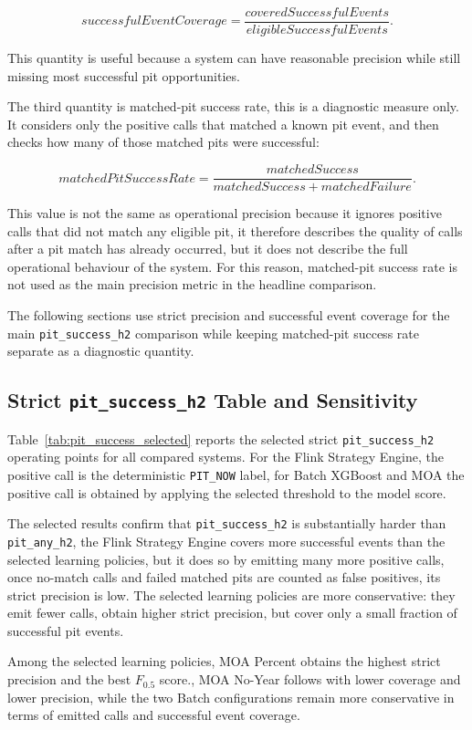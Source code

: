 \[
    successfulEventCoverage =
    \frac{coveredSuccessfulEvents}{eligibleSuccessfulEvents}.
\]

This quantity is useful because a system can have reasonable precision while still missing most successful pit opportunities.

The third quantity is matched-pit success rate, this is a diagnostic measure only. It considers only the positive calls that matched a known pit event, and then checks how
many of those matched pits were successful:

\[
    matchedPitSuccessRate =
    \frac{matchedSuccess}{matchedSuccess + matchedFailure}.
\]

This value is not the same as operational precision because it ignores positive calls that did not match any eligible pit, it therefore describes the quality of calls after
a pit match has already occurred, but it does not describe the full operational behaviour of the system. For this reason, matched-pit success rate is not used as the main
precision metric in the headline comparison.

The following sections use strict precision and successful event coverage for the main \texttt{pit\_success\_h2} comparison while keeping matched-pit success rate separate as
a diagnostic quantity.

\subsection{Strict \texttt{pit\_success\_h2} Table and Sensitivity}

Table~\ref{tab:pit_success_selected} reports the selected strict \texttt{pit\_success\_h2} operating points for all compared systems. For the Flink Strategy Engine,
the positive call is the deterministic \texttt{PIT\_NOW} label, for Batch XGBoost and MOA the positive call is obtained by applying the selected threshold to the model score.

The selected results confirm that \texttt{pit\_success\_h2} is substantially harder than \texttt{pit\_any\_h2}, the Flink Strategy Engine covers more successful events
than the selected learning policies, but it does so by emitting many more positive calls, once no-match calls and failed matched pits are counted as false positives,
its strict precision is low. The selected learning policies are more conservative: they emit fewer calls, obtain higher strict precision, but cover only a small fraction
of successful pit events.

Among the selected learning policies, MOA Percent obtains the highest strict precision and the best $F_{0.5}$ score., MOA No-Year follows with lower coverage and lower
precision, while the two Batch configurations remain more conservative in terms of emitted calls and successful event coverage.

